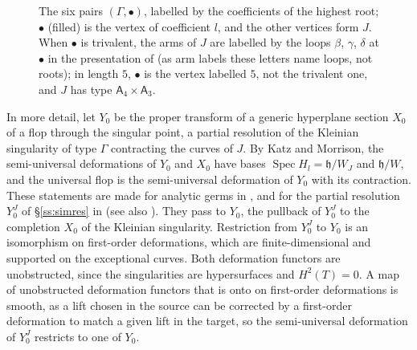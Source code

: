 \documentclass[11pt]{amsart}
\makeatletter
\numberwithin{table}{section}
\numberwithin{figure}{section}
\numberwithin{equation}{section}
\theoremstyle{definition}
\theoremstyle{plain}
\newcommand{\h}{\mathfrak{h}}
\newcommand{\bul}{\bullet}
\DeclareMathOperator{\Spec}{Spec}
\renewcommand\paragraph{\@startsection{paragraph}{4}{\z@}{\medskipamount}{-.5em}{\normalfont\bfseries}}
\makeatother
\begin{document}
\begin{figure}[ht]
\caption{The six pairs $(\Gamma, \bul)$, labelled by the coefficients of the highest root; $\bul$ (filled) is the vertex of coefficient $l$, and the other vertices form $J$. When $\bul$ is trivalent, the arms of $J$ are labelled by the loops $\beta$, $\gamma$, $\delta$ at $\bul$ in the presentation of \cite{K} (as arm labels these letters name loops, not roots); in length $5$, $\bul$ is the vertex labelled $5$, not the trivalent one, and $J$ has type $\mathsf{A}_4 \times \mathsf{A}_3$.}\label{fig:pairs}
\end{figure}

\paragraph{Versality.} In more detail, let $Y_0$ be the proper transform of a generic hyperplane section $X_0$ of a flop through the singular point, a partial resolution of the Kleinian singularity of type $\Gamma$ contracting the curves of $J$. By Katz and Morrison, the semi-universal deformations of $Y_0$ and $X_0$ have bases $\Spec H_l = \h/W_J$ and $\h/W$, and the universal flop is the semi-universal deformation of $Y_0$ with its contraction. These statements are made for analytic germs in \cite{KM}, and for the partial resolution $Y_0^J$ of \S\ref{ss:simres} in \cite{K} (see also \cite{BKL}). They pass to $Y_0$, the pullback of $Y_0^J$ to the completion $X_0$ of the Kleinian singularity. Restriction from $Y_0^J$ to $Y_0$ is an isomorphism on first-order deformations, which are finite-dimensional and supported on the exceptional curves. Both deformation functors are unobstructed, since the singularities are hypersurfaces and $H^2(T) = 0$. A map of unobstructed deformation functors that is onto on first-order deformations is smooth, as a lift chosen in the source can be corrected by a first-order deformation to match a given lift in the target, so the semi-universal deformation of $Y_0^J$ restricts to one of $Y_0$.
\end{document}
